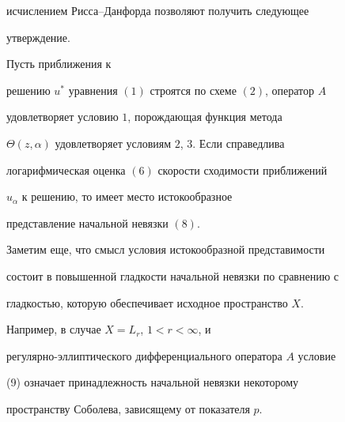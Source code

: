 исчислением Рисса--Данфорда позволяют получить следующее


утверждение.








\begin{thmnonum}


Пусть приближения к


решению $u^*$ уравнения $(1)$ строятся по схеме $(2)$, оператор $A$


удовлетворяет условию $1$, порождающая функция метода


$\Theta(z,\alpha)$ удовлетворяет условиям $2$, $3$. Если справедлива


логарифмическая оценка $(6)$ скорости сходимости приближений


$u_\alpha$ к решению, то имеет место истокообразное


представление начальной невязки $(8)$.


\end{thmnonum}





Заметим еще, что смысл условия истокообразной представимости


состоит в повышенной гладкости начальной невязки по сравнению с


гладкостью, которую обеспечивает исходное пространство $X$.


Например, в случае $X=L_r$, $1< r <\infty$, и


регулярно-эллиптического дифференциального оператора $A$ условие


(9) означает принадлежность начальной невязки некоторому


пространству Соболева, зависящему от показателя $p$.








